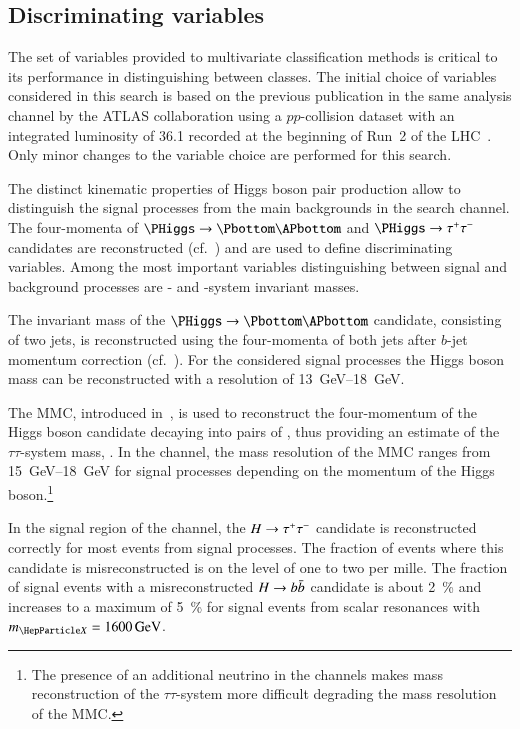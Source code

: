 \subsection{Discriminating variables}%
\label{sec:mva_discriminating variables}

The set of variables provided to multivariate classification methods
is critical to its performance in distinguishing between classes. The
initial choice of variables considered in this search is based on the
previous publication in the same analysis channel by the ATLAS
collaboration using a $pp$-collision dataset with an integrated
luminosity of \SI{36.1}{\ifb} recorded at the beginning of Run~2 of
the LHC~\cite{HIGG-2016-16-witherratum}. Only minor changes to the
variable choice are performed for this search.

The distinct kinematic properties of Higgs boson pair production allow
to distinguish the signal processes from the main backgrounds in the
\bbtautau search channel. The four-momenta of
$\PHiggs \ra \Pbottom\APbottom$ and $\PHiggs \ra \tautau$ candidates
are reconstructed (cf.~) and are
used to define discriminating variables. Among the most important
variables distinguishing between signal and background processes are
\PHiggs- and \HH-system invariant masses.

The invariant mass of the $\PHiggs \ra \Pbottom\APbottom$ candidate,
consisting of two \btagged jets, is reconstructed using the
four-momenta of both jets after $b$-jet momentum correction
(cf.~). For the considered signal
processes the Higgs boson mass can be reconstructed with a resolution
of \SIrange{13}{18}{\GeV}.

The MMC, introduced in~, is used to reconstruct
the four-momentum of the Higgs boson candidate decaying into pairs of
\tauleptons, thus providing an estimate of the $\tau\tau$-system mass,
\mMMC. In the \hadhad channel, the mass resolution of the MMC ranges
from \SIrange{15}{18}{\GeV} for signal processes depending on the
momentum of the Higgs boson.\footnote{The presence of an additional
  neutrino in the \lephad channels makes mass reconstruction of the
  $\tau\tau$-system more difficult degrading the mass resolution of
  the MMC.}

In the signal region of the \hadhad channel, the $H \to \tau^{+} \tau^{-}$
candidate is reconstructed correctly for most events from signal
processes. The fraction of events where this candidate is
misreconstructed is on the level of one to two per mille. The fraction
of signal events with a misreconstructed $H \to b\bar{b}$ candidate is
about \SI{2}{\percent} and increases to a maximum of \SI{5}{\percent}
for signal events from scalar resonances with $\mX = \SI{1600}{\GeV}$.

